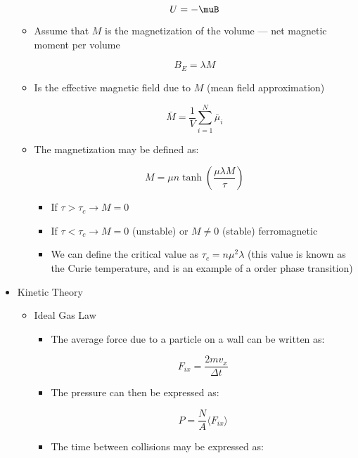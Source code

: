 \begin{itemize}
\begin{itemize}
        $$U=-\muB$$

      \item Assume that $M$ is the magnetization of the volume — net magnetic moment per volume

        $$B_E=\lambda M$$

      \item Is the effective magnetic field due to $M$ (mean field approximation)

        $$\bar{M}=\frac{1}{V}\sum_{i=1}^N\bar{\mu}_i$$

      \item The magnetization may be defined as:

        $$M=\mu n\tanh\left( \frac{\mu\lambda M}{\tau} \right)$$

        \begin{itemize}

          \item If $\tau>\tau_c\to M=0$

          \item If $\tau<\tau_c\to M=0$ (unstable) or $M\neq 0$ (stable) ferromagnetic

          \item We can define the critical value as $\tau_c=n\mu^2\lambda$ (this value is known as the Curie temperature, and is an example of a  order phase transition)

        \end{itemize}

    \end{itemize}

  \item Kinetic Theory

    \begin{itemize}

      \item Ideal Gas Law

        \begin{itemize}

          \item The average force due to a particle on a wall can be written as:

            $$F_{ix}=\frac{2mv_x}{\Delta t}$$

          \item The pressure can then be expressed as:

            $$P=\frac{N}{A}\langle F_{ix}\rangle$$

          \item The time between collisions may be expressed as:


\end{itemize}
\end{itemize}
\end{itemize}
